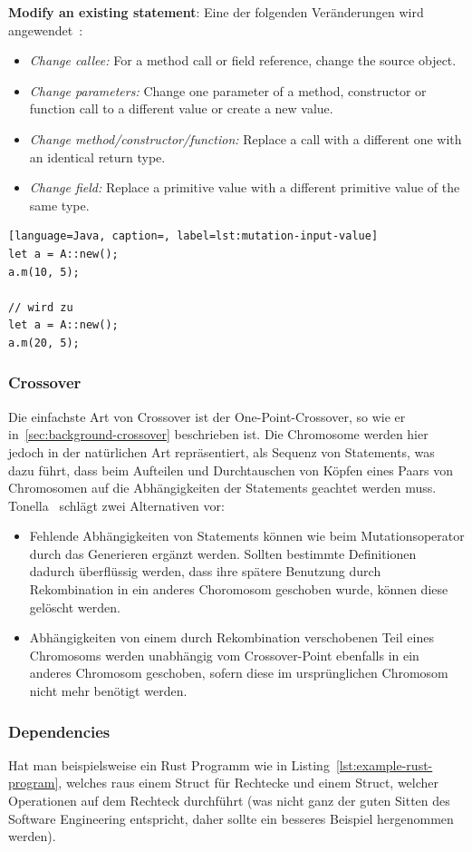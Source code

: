 \documentclass{article}
\begin{document}
\textbf{Modify an existing statement}: Eine der folgenden Veränderungen wird angewendet~\cite{Fraser2012}:
\begin{itemize}
  \item \textit{Change callee:} For a method call or field reference, change the source object.
  \item \textit{Change parameters:} Change one parameter of a method, constructor or function call to a different value or create a new value.
  \item \textit{Change method/constructor/function:} Replace a call with a different one with an identical return type.
  \item \textit{Change field:} Replace a primitive value with a different primitive value of the same type.
\end{itemize}
\begin{lstlisting}[language=Java, caption=, label=lst:mutation-input-value]
let a = A::new();
a.m(10, 5);

// wird zu 
let a = A::new();
a.m(20, 5);
\end{lstlisting}

\subsubsection{Crossover}
Die einfachste Art von Crossover ist der One-Point-Crossover, so wie er in~\cref{sec:background-crossover} beschrieben ist. Die Chromosome werden hier jedoch in der natürlichen Art repräsentiert, als Sequenz von Statements, was dazu führt, dass beim Aufteilen und Durchtauschen von Köpfen eines Paars von Chromosomen auf die Abhängigkeiten der Statements geachtet werden muss. Tonella~\cite{Tonella2004} schlägt zwei Alternativen vor:
\begin{itemize}
    \item Fehlende Abhängigkeiten von Statements können wie beim Mutationsoperator durch das Generieren ergänzt werden.  Sollten bestimmte Definitionen dadurch überflüssig werden, dass ihre spätere Benutzung durch Rekombination in ein anderes Choromosom geschoben wurde, können diese gelöscht werden. 
    \item Abhängigkeiten von einem durch Rekombination verschobenen Teil eines Chromosoms werden unabhängig vom Crossover-Point ebenfalls in ein anderes Chromosom geschoben, sofern diese im ursprünglichen Chromosom nicht mehr benötigt werden. 
\end{itemize}

\subsubsection{Dependencies}
Hat man beispielsweise ein Rust Programm wie in Listing~\ref{lst:example-rust-program}, welches raus einem Struct für Rechtecke und einem Struct, welcher Operationen auf dem Rechteck durchführt (was nicht ganz der guten Sitten des Software Engineering entspricht, daher sollte ein besseres Beispiel hergenommen werden). 
\end{document}
